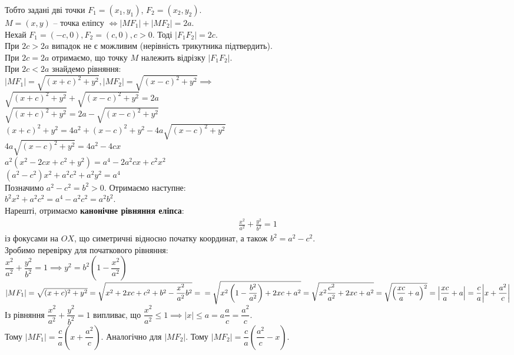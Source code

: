 \documentclass[a4paper, 10pt]{extarticle}
\theoremstyle{theoremdd}
\theoremstyle{theoremdd}
\theoremstyle{theoremdd}
\theoremstyle{theoremdd}
\theoremstyle{theoremdd}
\theoremstyle{theoremdd}
\theoremstyle{theoremdd}
\theoremstyle{theoremdd}
\begin{document}
Тобто задані дві точки $F_1 = (x_1,y_1)$, $F_2 = (x_2,y_2)$.\\
$M = (x,y)$ -- точка еліпсу $\iff |MF_1|+|MF_2| = 2a$.
\bigskip \\
Нехай $F_1 = (-c,0), F_2 = (c,0), c > 0$. Тоді $|F_1F_2|=2c$.\\
При $2c > 2a$ випадок не є можливим (нерівність трикутника підтвердить).\\
При $2c = 2a$ отримаємо, що точку $M$ належить відрізку $|F_1F_2|$.\\
При $2c < 2a$ знайдемо рівняння:\\
$|MF_1|=\sqrt{(x+c)^2+y^2}, |MF_2|=\sqrt{(x-c)^2+y^2} \implies$\\
$\sqrt{(x+c)^2+y^2} + \sqrt{(x-c)^2+y^2} = 2a$\\
$\sqrt{(x+c)^2+y^2} = 2a - \sqrt{(x-c)^2+y^2}$\\
$(x+c)^2+y^2=4a^2+(x-c)^2+y^2-4a\sqrt{(x-c)^2+y^2}$\\
$4a\sqrt{(x-c)^2+y^2} = 4a^2 -4cx$\\
$a^2(x^2-2cx+c^2+y^2)=a^4-2a^2cx+c^2x^2$\\
$(a^2-c^2)x^2+a^2c^2+a^2y^2=a^4$\\
Позначимо $a^2-c^2=b^2>0$. Отримаємо наступне:\\
$b^2x^2+a^2c^2=a^4-a^2c^2=a^2b^2$.\\
Нарешті, отримаємо \textbf{канонічне рівняння еліпса}:
\begin{align*}
\frac{x^2}{a^2} + \frac{y^2}{b^2} = 1
\end{align*}
із фокусами на $OX$, що симетричні відносно початку координат, а також $b^2 = a^2 - c^2$.
\bigskip \\
Зробимо перевірку для початкового рівняння:\\
$\dfrac{x^2}{a^2} + \dfrac{y^2}{b^2} = 1 \implies y^2 = b^2\left(1 - \dfrac{x^2}{a^2} \right)$\\
$|MF_1| = \sqrt{(x+c)^2+y^2} = \sqrt{x^2+2xc+c^2+b^2 - \dfrac{x^2}{a^2}b^2} = \\ = \sqrt{x^2 \left(1 - \dfrac{b^2}{a^2} \right) + 2xc + a^2} = \sqrt{x^2 \dfrac{c^2}{a^2} + 2xc + a^2} = \sqrt{\left(\dfrac{xc}{a} + a\right)^2} = \abs{\dfrac{xc}{a}+a} = \dfrac{c}{a} \abs{x + \dfrac{a^2}{c}}$\\
Із рівняння $\dfrac{x^2}{a^2} + \dfrac{y^2}{b^2} = 1$ випливає, що $\dfrac{x^2}{a^2} \leq 1 \implies |x| \leq a = a \dfrac{a}{c} = \dfrac{a^2}{c}$.\\
Тому $|MF_1| = \dfrac{c}{a} \left(x + \dfrac{a^2}{c} \right)$. Аналогічно для $|MF_2|$. Тому $|MF_2| = \dfrac{c}{a} \left(\dfrac{a^2}{c} - x\right)$.\\
\end{document}
